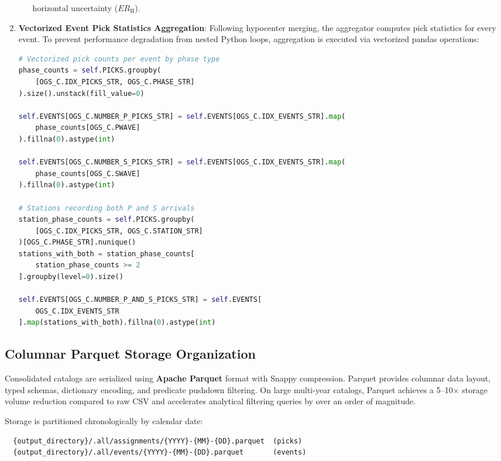\begin{enumerate}
\begin{itemize}
        horizontal uncertainty ($ER_{\mathrm{H}}$).
    \end{itemize}
  \item \textbf{Vectorized Event Pick Statistics Aggregation}:
    Following hypocenter merging, the aggregator computes pick
    statistics for every event. To prevent performance degradation
    from nested Python loops, aggregation is executed via
    vectorized pandas operations:
  \begin{lstlisting}[language=Python, basicstyle=\ttfamily\scriptsize]
# Vectorized pick counts per event by phase type
phase_counts = self.PICKS.groupby(
    [OGS_C.IDX_PICKS_STR, OGS_C.PHASE_STR]
).size().unstack(fill_value=0)

self.EVENTS[OGS_C.NUMBER_P_PICKS_STR] = self.EVENTS[OGS_C.IDX_EVENTS_STR].map(
    phase_counts[OGS_C.PWAVE]
).fillna(0).astype(int)

self.EVENTS[OGS_C.NUMBER_S_PICKS_STR] = self.EVENTS[OGS_C.IDX_EVENTS_STR].map(
    phase_counts[OGS_C.SWAVE]
).fillna(0).astype(int)

# Stations recording both P and S arrivals
station_phase_counts = self.PICKS.groupby(
    [OGS_C.IDX_PICKS_STR, OGS_C.STATION_STR]
)[OGS_C.PHASE_STR].nunique()
stations_with_both = station_phase_counts[
    station_phase_counts >= 2
].groupby(level=0).size()

self.EVENTS[OGS_C.NUMBER_P_AND_S_PICKS_STR] = self.EVENTS[
    OGS_C.IDX_EVENTS_STR
].map(stations_with_both).fillna(0).astype(int)
  \end{lstlisting}
\end{enumerate}

\subsection{Columnar Parquet Storage Organization}
\label{subsec:parquet_storage}

Consolidated catalogs are serialized using \textbf{Apache Parquet}
format with Snappy compression. Parquet provides columnar data
layout, typed schemas, dictionary encoding, and predicate pushdown
filtering. On large multi-year catalogs, Parquet achieves a
\numrange{5}{10}$\times$ storage volume reduction compared to
raw CSV and accelerates analytical filtering queries by over an
order of magnitude.

Storage is partitioned chronologically by calendar date:
\begin{verbatim}
  {output_directory}/.all/assignments/{YYYY}-{MM}-{DD}.parquet  (picks)
  {output_directory}/.all/events/{YYYY}-{MM}-{DD}.parquet       (events)
\end{verbatim}

